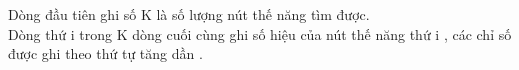 Dòng đầu tiên ghi số K là số lượng nút thế năng tìm được.
\\Dòng thứ i trong K dòng cuối cùng ghi số hiệu của nút thế năng thứ i , các chỉ số được ghi theo thứ tự tăng dần .

\